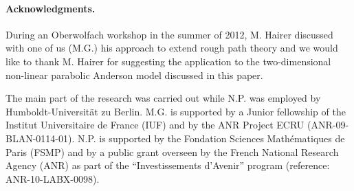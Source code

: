 \documentclass[a4paper,11pt]{article}
\theoremstyle{remark}
\begin{document}
\paragraph{Acknowledgments.} 
During an Oberwolfach workshop in the summer of 2012, M. Hairer discussed with one of us (M.G.) his approach to extend rough path theory and  we would like to thank M. Hairer for suggesting the application to the two-dimensional non-linear parabolic Anderson model discussed in this paper.

The main part of the research was carried out while N.P. was employed by Humboldt-Universit\"at zu Berlin. M.G. is supported by a Junior fellowship of the Institut Universitaire de France (IUF) and  by the ANR Project ECRU (ANR-09-BLAN-0114-01). N.P. is supported by the Fondation Sciences Math\'ematiques de Paris (FSMP) and by a public grant overseen by the French National Research Agency (ANR) as part of the ``Investissements d'Avenir'' program (reference: ANR-10-LABX-0098).



%
%
%
\end{document}
